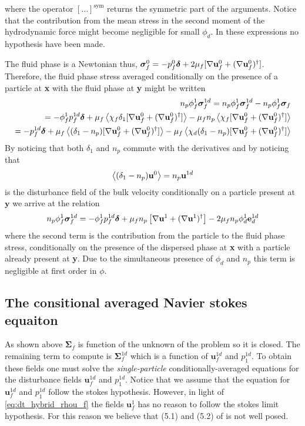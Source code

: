 where the operator $[\ldots]^\text{sym}$ returns the symmetric part of the arguments.
Notice that the contribution from the mean stress in the second moment of the hydrodynamic force might become negligible for small $\phi_d$. 
In these expressions no hypothesis have been made. 


The fluid phase is a Newtonian thus, $\bm\sigma_f^0 = - p_f^0\bm\delta + 2\mu_f [\mathbf{\nabla} \textbf{u}_f^0 + (\mathbf{\nabla} \textbf{u}_f^0)^\dagger]$.
Therefore, the fluid phase stress averaged conditionally on the presence of a particle at \textbf{x} with the fluid phase at \textbf{y} might be written
\begin{align*}
    n_p \phi_f^1 \bm\sigma_f^{1d} = 
    n_p \phi_f^1 \bm\sigma_f^{1d} 
    - n_p \phi_f^1 \bm\sigma_f \\
    = - \phi_f^1 p_f^{1d}\bm\delta 
    + \mu_f \left<\chi_f \delta_1 [\mathbf{\nabla} \textbf{u}_f^0 + (\mathbf{\nabla} \textbf{u}_f^0)^\dagger] \right>
    - \mu_f n_p \left<\chi_f [\mathbf{\nabla} \textbf{u}_f^0 + (\mathbf{\nabla} \textbf{u}_f^0)^\dagger] \right>\\
    =- p_f^{1d}\bm\delta 
    + \mu_f \left<(\delta_1 - n_p) [\mathbf{\nabla} \textbf{u}_f^0 + (\mathbf{\nabla} \textbf{u}_f^0)^\dagger] \right>
    - \mu_f \left<\chi_d (\delta_1 - n_p) [\mathbf{\nabla} \textbf{u}_f^0 + (\mathbf{\nabla} \textbf{u}_f^0)^\dagger] \right>
\end{align*}
By noticing that both $\delta_1$ and $n_p$ commute with the derivatives and by noticing that  
\begin{equation*}
    \left<(\delta_1 - n_p)  \textbf{u}^0\right>
    = 
    n_p \textbf{u}^{1d}
\end{equation*}
is the disturbance field of the bulk velocity conditionally on a particle present at $\textbf{y}$ we arrive at the relation 
\begin{align*}
    n_p \phi_f^1 \bm\sigma_f^{1d} = 
    - \phi_f^1 p_f^{1d} \bm\delta 
    + \mu_f n_p \left[\mathbf{\nabla} \textbf{u}^1 + (\mathbf{\nabla} \textbf{u}^1)^\dagger\right]
    - 2 \mu_f n_p \phi_d^1 \textbf{e}_d^{1d}
\end{align*}
where the second term is the contribution from the particle to the fluid phase stress, conditionally on the presence of the dispersed phase at \textbf{x} with a particle already present at \textbf{y}. 
Due to the simultaneous presence of $\phi_d$ and $n_p$ this term is negligible at first order in $\phi$. 

\subsection*{The consitional averaged Navier stokes equaiton}
As shown above $\bm\Sigma_f$ is function of the unknown of the problem so it is closed. 
The remaining term to compute is $\bm\Sigma_f^{1d}$ which is a function of $\textbf{u}_f^{1d}$ and $p_1^{1d}$. 
To obtain these fields one must solve the \textit{single-particle} conditionally-averaged equations for the disturbance fields  $\textbf{u}_f^{1d}$ and $p_1^{1d}$. 
Notice that we assume that the equation for  $\textbf{u}_f^{1d}$ and $p_1^{1d}$ follow the stokes hypothesis. 
However, in light of \ref{eq:dt_hybrid_rhou_f} the fields $\textbf{u}_f^{1}$ has no reason to follow the stokes limit hypothesis. 
For this reason we believe that (5.1) and (5.2) of \citet{zhang1997momentum} is not well posed. 

